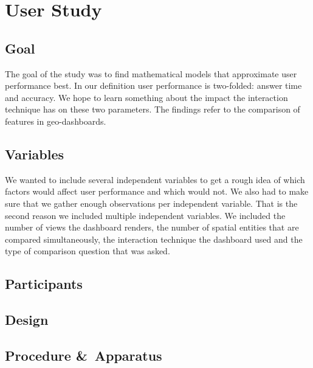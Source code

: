 \chapter{User Study}

\section{Goal}
The goal of the study was to find mathematical models that approximate user performance best. In our definition user
performance is two-folded: answer time and accuracy. We hope to learn something about the impact the interaction technique
has on these two parameters. The findings refer to the comparison of features in geo-dashboards.
\section{Variables}
We wanted to include several independent variables to get a rough idea of which factors would affect user performance and
which would not. We also had to make sure that we gather enough observations per independent variable. That is the second
reason we included multiple independent variables. We included the number of views the dashboard renders, the number of
spatial entities that are compared simultaneously, the interaction technique the dashboard used and the type of comparison
question that was asked.

\section{Participants}

\section{Design}
\section{Procedure \&\ Apparatus}